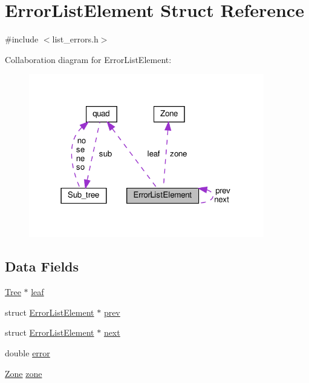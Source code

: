 \hypertarget{structErrorListElement}{}\section{Error\+List\+Element Struct Reference}
\label{structErrorListElement}


{\ttfamily \#include $<$list\+\_\+errors.\+h$>$}



Collaboration diagram for Error\+List\+Element\+:\nopagebreak
\begin{figure}[H]
\begin{center}
\leavevmode
\includegraphics[width=291pt]{structErrorListElement__coll__graph}
\end{center}
\end{figure}
\subsection*{Data Fields}
\begin{DoxyCompactItemize}
\item 
\hyperlink{quadtree_8h_a184f2f10109642ad84b5619bcc5738da}{Tree} $\ast$ \hyperlink{structErrorListElement_aa720e1423b3a1835aac938181639a683}{leaf}
\item 
struct \hyperlink{structErrorListElement}{Error\+List\+Element} $\ast$ \hyperlink{structErrorListElement_a8184726f75bedf47c0b44e71457ed070}{prev}
\item 
struct \hyperlink{structErrorListElement}{Error\+List\+Element} $\ast$ \hyperlink{structErrorListElement_a04526d09e8422e2a18dcea27b81acbc8}{next}
\item 
double \hyperlink{structErrorListElement_ab91e05dff2aa062ae71a3b664f60fc71}{error}
\item 
\hyperlink{structZone}{Zone} \hyperlink{structErrorListElement_a64696b98a5f211dff6ced86e55cf8fe4}{zone}
\end{DoxyCompactItemize}



